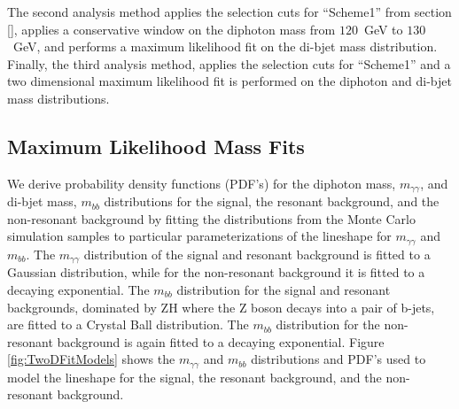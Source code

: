 \documentclass{cmspaper}
\begin{document}
The second analysis method applies the selection cuts for ``Scheme1'' from section \ref{}, applies
a conservative window on the diphoton mass from $120$~GeV to $130$~GeV, and performs a maximum
likelihood fit on the di-bjet mass distribution. Finally, the third analysis method, applies
the selection cuts for ``Scheme1'' and a two dimensional maximum likelihood fit is performed
on the diphoton and di-bjet mass distributions.

\subsection{Maximum Likelihood Mass Fits}
\label{sec:massfits}

We derive probability density functions (PDF's) for the diphoton mass, $m_{\gamma\gamma}$, and di-bjet mass, $m_{bb}$
 distributions for the signal, the resonant background, and the non-resonant background by 
fitting the distributions from the Monte Carlo simulation samples to particular parameterizations 
of the lineshape for $m_{\gamma\gamma}$ and $m_{bb}$. The $m_{\gamma\gamma}$
distribution of the signal and resonant background is fitted to a Gaussian distribution, while for
the non-resonant background it is fitted to a decaying exponential. The $m_{bb}$ distribution 
for the signal and resonant backgrounds, dominated by ZH where the Z boson decays into a pair of b-jets,
are fitted to a Crystal Ball distribution. The $m_{bb}$ distribution for the non-resonant background is
again fitted to a decaying exponential. Figure \ref{fig:TwoDFitModels} shows the $m_{\gamma\gamma}$
and $m_{bb}$ distributions and PDF's used to model the lineshape for the signal, the resonant background,
and the non-resonant background.
\end{document}
